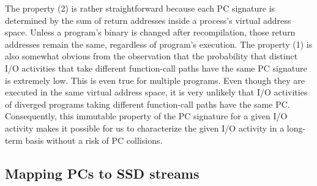 The property (2) is rather straightforward because each PC signature is
determined by the sum of return addresses inside a process's virtual address
space.  Unless a program's binary is changed after recompilation, those return
addresses remain the same, regardless of program's execution.  The property (1)
is also somewhat obvious from the observation that the probability that
distinct I/O activities that take different function-call paths have the same
PC signature is extremely low. This is even true for multiple programs. Even
though they are executed in the same virtual address space, it is very unlikely
that I/O activities of diverged programs taking different function-call paths
have the same PC.  Consequently, this immutable property of the PC signature
for a given I/O activity makes it possible for us to characterize the given I/O
activity in a long-term basis without a risk of PC collisions.


\vspace{-10pt}
\subsection{Mapping PCs to SSD streams}
\vspace{-5pt}

